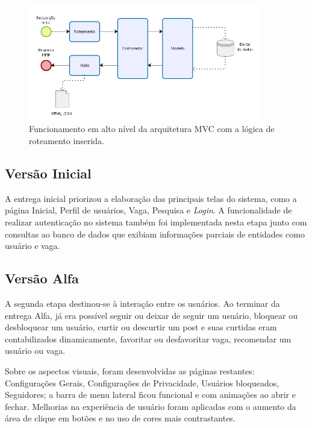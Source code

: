 \begin{figure}[h]
    \caption{ Funcionamento em alto nível da arquitetura MVC com a lógica de roteamento inserida.}
        \begin{center}
            \includegraphics[width=0.9\textwidth]{figuras/roteamento.png}
        \end{center}
    \label{routeFramework}
\end{figure}


\subsection{Versão Inicial}
\label{implementacaoIR}

A entrega inicial priorizou a elaboração das principais telas do sistema, como a página Inicial, Perfil de usuários, Vaga, Pesquisa e \textit{Login}. A funcionalidade de realizar autenticação no sistema também foi implementada nesta etapa junto com consultas ao banco de dados que exibiam informações parciais de entidades como usuário e vaga.

\subsection{Versão Alfa}
\label{implementacaoAR}

A segunda etapa destinou-se à interação entre os usuários. Ao terminar da entrega Alfa, já era possível seguir ou deixar de seguir um usuário, bloquear ou desbloquear um usuário, curtir ou descurtir um post e suas curtidas eram contabilizados dinamicamente, favoritar ou desfavoritar vaga, recomendar um usuário ou vaga. 

Sobre os aspectos visuais, foram desenvolvidas as páginas restantes: Configurações Gerais, Configurações de Privacidade, Usuários bloqueados, Seguidores; a barra de menu lateral ficou funcional e com animações ao abrir e fechar. Melhorias na experiência de usuário foram aplicadas com o aumento da área de clique em botões e no uso de cores mais contrastantes.


